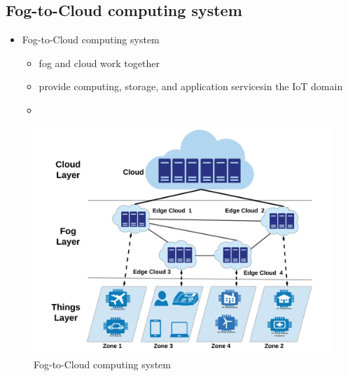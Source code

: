 \documentclass{beamer}
\begin{document}
\subsection[Fog-to-Cloud]{Fog-to-Cloud computing system}
\begin{frame}
	\begin{itemize}
	\item Fog-to-Cloud computing system
	\begin{itemize}
		\item<1-> {fog and cloud work together}
		\item<2-> {provide computing, storage, and application servicesin the IoT domain}
		\item<3-> \color{red}{complex management of such a
			network of distributed fogs}
			
	\end{itemize}
\end{itemize}
\begin{figure}
	\centering
	\includegraphics[scale=0.13]{"Fog-to-cloud computing system"}
	\caption{Fog-to-Cloud computing system}
	\label{fig:fog-to-cloud-computing-system}
\end{figure}
\end{frame}
\end{document}
